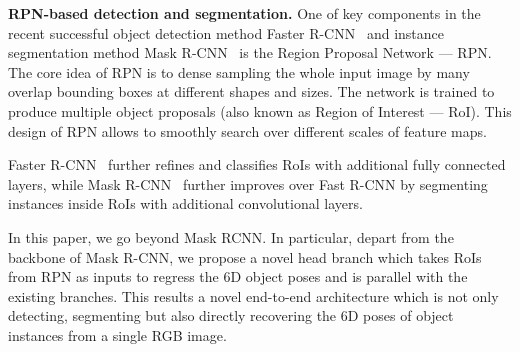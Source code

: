 \documentclass[conference]{IEEEtran}
\newcommand{\junk}[1]{}
\begin{document}
\textbf{RPN-based detection and segmentation.} One of key components in the recent successful object detection method  Faster R-CNN~\cite{Faster-RCNN} and instance segmentation method Mask R-CNN~\cite{Mask-RCNN} is the Region Proposal Network --- RPN. The core idea of RPN is to dense sampling the whole input image by many overlap bounding boxes at different shapes and sizes. The network is trained to produce multiple object proposals (also known as Region of Interest --- RoI). This design of RPN allows to smoothly search over different scales of feature maps. 
\junk{
For each RoI, a fixed-size small feature map (e.g., $7\times7$) is pooled from the image feature map using the RoIPool layer~\cite{RCNN} or RoIAlign layer~\cite{Mask-RCNN}. These layers work by dividing the RoI into a regular grid and then max-pooling the feature map values in each grid cell. In Faster R-CNN, the outputs of the RoIPool layer are used to refine the RoI coordinates and to classify the RoI label. In Mask-RCNN, the outputs of the RoIAlign layer are used not only for refining and recognizing the RoI but also for segmenting the object inside the RoI. %
}
Faster R-CNN~\cite{Faster-RCNN} further refines and classifies RoIs with additional fully connected layers, %
while Mask R-CNN~\cite{Mask-RCNN} further improves over Fast R-CNN by segmenting instances inside RoIs with additional convolutional layers. 

In this paper, we go beyond Mask RCNN. In particular, depart from the backbone of Mask R-CNN, we propose a novel head branch which takes RoIs from RPN as inputs to regress the 6D object poses and is parallel with the existing branches. This results a novel end-to-end architecture which is not only detecting, segmenting but also directly recovering the 6D poses of object instances from a single RGB image. 
\end{document}
